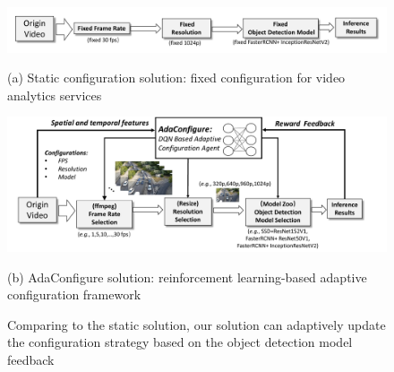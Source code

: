 \begin{figure}[!t]
	\begin{minipage}{\linewidth}
		\centerline{\includegraphics[width=0.9\linewidth]{figures/static_framework.pdf}}
		\begin{center}
			{(a) Static configuration solution: fixed configuration for video analytics services}
		\end{center}
	\end{minipage}
	\vfill
	\vspace{0.2cm}
	\begin{minipage}{\linewidth}
		\centerline{\includegraphics[width=0.9\linewidth]{figures/auto_framework.pdf}}
		\vspace{0.2cm}
		\begin{center}
			{(b) AdaConfigure solution: reinforcement learning-based adaptive configuration framework}
		\end{center}
	\end{minipage}
	\caption{Comparing to the static solution, our solution can adaptively update the configuration strategy based on the object detection model feedback}
	\label{fig: framework}
\end{figure}

